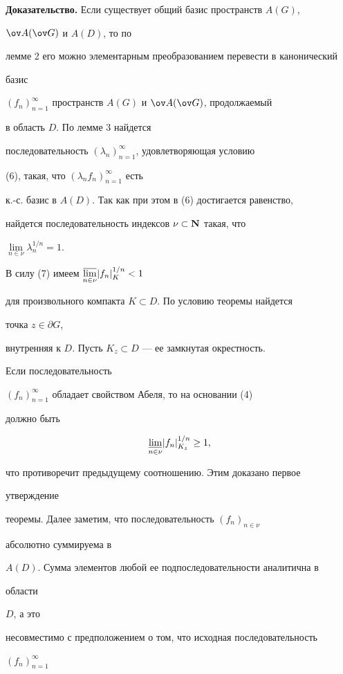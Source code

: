 


{\bf Доказательство.} Если существует общий базис пространств $A(G)$, 


$\ov A(\ov G)$ и $A(D)$, то по 


лемме 2 его можно элементарным преобразованием перевести в канонический 


базис 


$(f_n)^\infty_{n=1}$ пространств $A(G)$ и $\ov A(\ov G)$, продолжаемый 


в область $D$. По лемме 3 найдется 


последовательность $(\lambda_n)^\infty_{n=1}$, удовлетворяющая условию 


(6), такая, что $(\lambda_n f_n)^\infty_{n=1}$ есть 


к.-с. базис в $A(D)$. Так как при этом в (6) достигается равенство, 


найдется последовательность индексов $\nu\subset\bold N$ такая, что 


$\lim\limits_{n\in\nu}\lambda^{1/n}_n=1$. 


В силу (7) имеем $\underset{n\in\nu}{\varlimsup}{}|f_n|^{1/n}_K<1$ 


для произвольного компакта $K\subset D$. По условию теоремы найдется 


точка $z\in\partial G$, 


внутренняя к $D$. Пусть $K_z\subset D$ --- ее замкнутая окрестность. 


Если последовательность 


$(f_n)^\infty_{n=1}$ обладает свойством Абеля, то на основании (4) 


должно быть 


$$ 


\underset{n\in\nu}{\varliminf}{}|f_n|^{1/n}_{K_z}\ge1, 


$$ 


что противоречит предыдущему соотношению. Этим доказано первое 


утверждение 


теоремы. Далее заметим, что последовательность $(f_n)_{n\in\nu}$ 


абсолютно суммируема в 


$A(D)$. Сумма элементов любой ее подпоследовательности аналитична в 


области 


$D$, а это 


несовместимо с предположением о том, что исходная последовательность 


$(f_n)^\infty_{n=1}$ 


